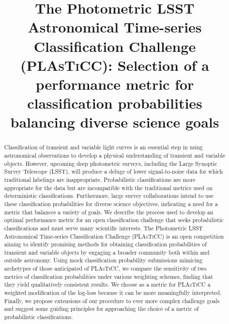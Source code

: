\documentclass[\docopts]{\docclass}
\begin{document}

\title{The Photometric \textsc{LSST} Astronomical Time-series Classification Challenge (\textsc{PLAsTiCC}): Selection of a performance metric for classification probabilities balancing diverse science goals}

\maketitlepre

\begin{abstract}

  Classification of transient and variable light curves is an essential step in using astronomical observations to develop a physical understanding of transient and variable objects.
  However, upcoming deep photometric surveys, including the Large Synoptic Survey Telescope (\textsc{LSST}), will produce a deluge of lower signal-to-noise data for which traditional labelings are inappropriate.
  Probabilistic classifications are more appropriate for the data but are incompatible with the traditional metrics used on deterministic classifications.
  Furthermore, large survey collaborations intend to use these classification probabilities for diverse science objectives, indicating a need for a metric that balances a variety of goals.
  We describe the process used to develop an optimal performance metric for an open classification challenge that seeks probabilistic classifications and must serve many scientific interests.
  The Photometric \textsc{LSST} Astronomical Time-series Classification Challenge (\textsc{PLAsTiCC}) is an open competition aiming to identify promising methods for obtaining classification probabilities of transient and variable objects by engaging a broader community both within and outside astronomy.
  Using mock classification probability submissions mimicing archetypes of those anticipated of \textsc{PLAsTiCC}, we compare the sensitivity of two metrics of classification probabilities under various weighting schemes, finding that they yield qualitatively consistent results.
  We choose as a metric for \textsc{PLAsTiCC} a weighted modification of the log-loss because it can be more meaningfully interpreted.
  Finally, we propose extensions of our procedure to ever more complex challenge goals and suggest some guiding principles for approaching the choice of a metric of probabilistic classifications.

\end{abstract}

\dockeys{}

\maketitlepost
\end{document}
